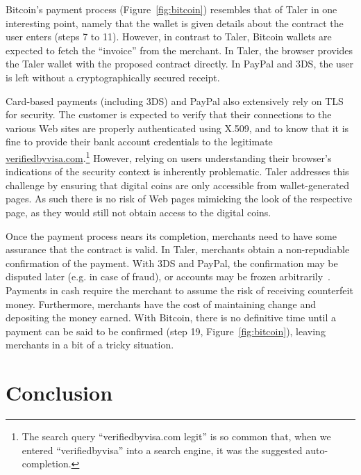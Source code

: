 \documentclass{llncs}
\begin{document}
Bitcoin's payment process (Figure~\ref{fig:bitcoin}) resembles that of
Taler in one interesting point, namely that the wallet is given
details about the contract the user enters (steps 7 to 11).
However, in contrast to Taler, Bitcoin wallets are expected
to fetch the ``invoice'' from the merchant. In Taler, the browser
provides the Taler wallet with the proposed contract directly.  In
PayPal and 3DS, the user is left without a cryptographically secured
receipt.

Card-based payments (including 3DS) and PayPal also extensively rely
on TLS for security.  The customer is expected to verify that their
connections to the various Web sites are properly authenticated using
X.509, and to know that it is fine to provide their bank account
credentials to the legitimate
\url{verifiedbyvisa.com}.\footnote{The search query
``verifiedbyvisa.com legit'' is so common that, when we entered
``verifiedbyvisa'' into a search engine, it was the suggested
auto-completion.}  However, relying on users understanding their
browser's indications of the security context is inherently
problematic.  Taler addresses this challenge by ensuring that digital
coins are only accessible from wallet-generated pages. As such
there is no risk of Web pages mimicking the look of the respective
page, as they would still not obtain access to the digital coins.

Once the payment process nears its completion, merchants need to have
some assurance that the contract is valid.  In Taler, merchants
obtain a non-repudiable confirmation of the payment.  With 3DS and
PayPal, the confirmation may be disputed later (e.g. in case of
fraud), or accounts may be frozen arbitrarily~\cite{diaspora2011}.
Payments in cash require the merchant to assume the risk of receiving
counterfeit money.
Furthermore, merchants have the cost of maintaining change and depositing
the money earned.  With Bitcoin, there is no definitive time until a
payment can be said to be confirmed (step 19, Figure~\ref{fig:bitcoin}),
leaving merchants in a bit of a tricky situation.

\section{Conclusion}
\end{document}
